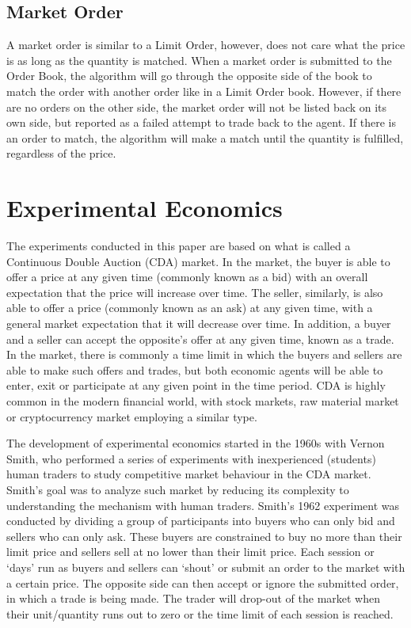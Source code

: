 \subsection{Market Order}
A market order is similar to a Limit Order, however, does not care what the price is as long as the quantity is matched. When a market order is submitted to the Order Book, the algorithm will go through the opposite side of the book to match the order with another order like in a Limit Order book. However, if there are no orders on the other side, the market order will not be listed back on its own side, but reported as a failed attempt to trade back to the agent. If there is an order to match, the algorithm will make a match until the quantity is fulfilled, regardless of the price. 

\section{Experimental Economics}
The experiments conducted in this paper are based on what is called a Continuous Double Auction (CDA) market. In the market, the buyer is able to offer a price at any given time (commonly known as a bid) with an overall expectation that the price will increase over time. The seller, similarly, is also able to offer a price (commonly known as an ask)  at any given time, with a general market expectation that it will decrease over time. In addition, a buyer and a seller can accept the opposite’s offer at any given time, known as a trade. In the market, there is commonly a time limit in which the buyers and sellers are able to make such offers and trades, but both economic agents will be able to enter, exit or participate at any given point in the time period. CDA is highly common in the modern financial world, with stock markets, raw material market or cryptocurrency market employing a similar type. 

The development of experimental economics started in the 1960s with Vernon Smith, who performed a series of experiments with inexperienced (students) human traders to study competitive market behaviour in the CDA market. Smith’s goal was to analyze such market by reducing its complexity to understanding the mechanism with human traders. Smith’s 1962 experiment was conducted by dividing a group of participants into buyers who can only bid and sellers who can only ask. These buyers are constrained to buy no more than their limit price and sellers sell at no lower than their limit price. Each session or ‘days’ run as buyers and sellers can ‘shout’ or submit an order to the market with a certain price. The opposite side can then accept or ignore the submitted order, in which a trade is being made. The trader will drop-out of the market when their unit/quantity runs out to zero or the time limit of each session is reached. 

